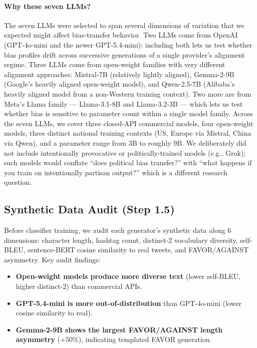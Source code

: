\documentclass[11pt]{article}
\begin{document}
\paragraph{Why these seven LLMs?}
The seven LLMs were selected to span several dimensions of variation that we expected might affect bias-transfer behavior. Two LLMs come from OpenAI (GPT-4o-mini and the newer GPT-5.4-mini): including both lets us test whether bias profiles drift across successive generations of a single provider's alignment regime. Three LLMs come from open-weight families with very different alignment approaches: Mistral-7B (relatively lightly aligned), Gemma-2-9B (Google's heavily aligned open-weight model), and Qwen-2.5-7B (Alibaba's heavily aligned model from a non-Western training context). Two more are from Meta's Llama family --- Llama-3.1-8B and Llama-3.2-3B --- which lets us test whether bias is sensitive to parameter count within a single model family. Across the seven LLMs, we cover three closed-API commercial models, four open-weight models, three distinct national training contexts (US, Europe via Mistral, China via Qwen), and a parameter range from 3B to roughly 9B. We deliberately did not include intentionally provocative or politically-trained models (e.g., Grok); such models would conflate ``does political bias transfer?'' with ``what happens if you train on intentionally partisan output?'' which is a different research question.

\subsection{Synthetic Data Audit (Step 1.5)}
Before classifier training, we audit each generator's synthetic data along 6 dimensions: character length, hashtag count, distinct-2 vocabulary diversity, self-BLEU, sentence-BERT cosine similarity to real tweets, and FAVOR/AGAINST asymmetry. Key audit findings:

\begin{itemize}
    \item \textbf{Open-weight models produce more diverse text} (lower self-BLEU, higher distinct-2) than commercial APIs.
    \item \textbf{GPT-5.4-mini is more out-of-distribution} than GPT-4o-mini (lower cosine similarity to real).
    \item \textbf{Gemma-2-9B shows the largest FAVOR/AGAINST length asymmetry} (+50\%), indicating templated FAVOR generation.
\end{itemize}
\end{document}
